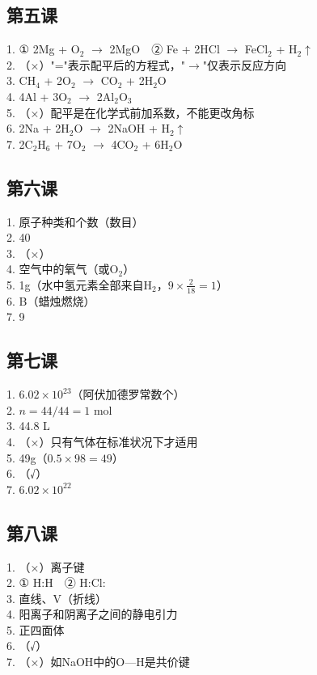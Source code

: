 \documentclass[a4paper,12pt]{ctexart}
\begin{document}
\subsection*{第五课}
1. ① 2Mg + O$_2$ $\rightarrow$ 2MgO　② Fe + 2HCl $\rightarrow$ FeCl$_2$ + H$_2$$\uparrow$\\
2. （×）"="表示配平后的方程式，"$\rightarrow$"仅表示反应方向\\
3. CH$_4$ + 2O$_2$ $\rightarrow$ CO$_2$ + 2H$_2$O\\
4. 4Al + 3O$_2$ $\rightarrow$ 2Al$_2$O$_3$\\
5. （×）配平是在化学式前加系数，不能更改角标\\
6. 2Na + 2H$_2$O $\rightarrow$ 2NaOH + H$_2$$\uparrow$\\
7. 2C$_2$H$_6$ + 7O$_2$ $\rightarrow$ 4CO$_2$ + 6H$_2$O

\subsection*{第六课}
1. 原子种类和个数（数目）\\
2. 40\\
3. （×）\\
4. 空气中的氧气（或O$_2$）\\
5. 1g（水中氢元素全部来自H$_2$，$9 \times \frac{2}{18}=1$）\\
6. B（蜡烛燃烧）\\
7. 9

\subsection*{第七课}
1. $6.02\times10^{23}$（阿伏加德罗常数个）\\
2. $n = 44/44 = 1$ mol\\
3. 44.8 L\\
4. （×）只有气体在标准状况下才适用\\
5. 49g（$0.5\times98=49$）\\
6. （√）\\
7. $6.02\times10^{22}$

\subsection*{第八课}
1. （×）离子键\\
2. ① H:H　② H:Cl:\\
3. 直线、V（折线）\\
4. 阳离子和阴离子之间的静电引力\\
5. 正四面体\\
6. （√）\\
7. （×）如NaOH中的O—H是共价键
\end{document}
